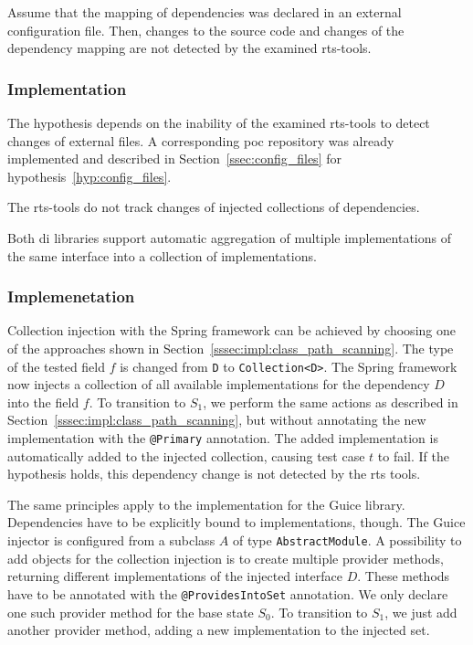 \begin{hypothesis}\label{hyp:dep_inj:external}
    Assume that the mapping of dependencies was declared
    in an external configuration file.
    Then, changes to the source code and changes of the dependency mapping are not
    detected by the examined \ac{rts}-tools.
\end{hypothesis}

\subsubsection{Implementation  }
The hypothesis depends on the inability of the examined \ac{rts}-tools to detect changes of external
files. A corresponding \ac{poc} repository was already implemented and described in
Section~\ref{ssec:config_files} for hypothesis~\ref{hyp:config_files}.

\begin{hypothesis}\label{hyp:dep_inj:collections}
    The \ac{rts}-tools do not track changes of injected collections of dependencies.
\end{hypothesis}

Both \ac{di} libraries support automatic aggregation of multiple implementations of the same interface into a collection
of implementations.

\subsubsection{Implemenetation  }
Collection injection with the Spring framework can be achieved by choosing one of the approaches
shown in Section~\ref{sssec:impl:class_path_scanning}. The type of the tested field $f$ is
changed from \texttt{D} to \texttt{Collection<D>}. The Spring framework now injects a collection
of all available implementations for the dependency $D$ into the field $f$. To transition to
$S_1$, we perform the same actions as described in Section~\ref{sssec:impl:class_path_scanning}, but without annotating the new implementation with the
\texttt{@Primary} annotation. The added implementation is automatically added to the injected
collection, causing test case $t$ to fail. If the hypothesis holds, this dependency change is not
detected by the \ac{rts} tools.

The same principles apply to the implementation for the Guice library. Dependencies have to be
explicitly bound to implementations, though. The Guice injector is configured from a subclass $A$ of
type \texttt{AbstractModule}. A possibility to add objects for the collection injection
is to create multiple provider methods, returning different implementations of the injected
interface $D$. These methods have to be annotated with the \texttt{@ProvidesIntoSet} annotation. We only
declare one such provider method for the base state $S_0$. To transition to
$S_1$, we just add another provider method, adding a new implementation to the injected
set.

